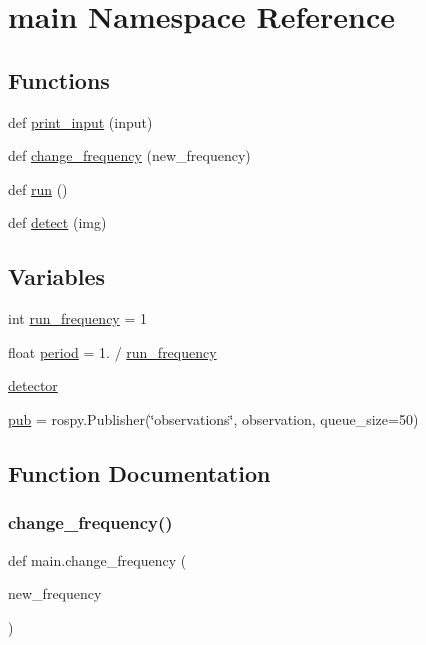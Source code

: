 \hypertarget{namespacemain}{}\section{main Namespace Reference}
\label{namespacemain}
\subsection*{Functions}
\begin{DoxyCompactItemize}
\item 
def \hyperlink{namespacemain_a0fe3fdb168f80f23bd787b6a6645d063}{print\+\_\+input} (input)
\item 
def \hyperlink{namespacemain_a191dcce5a995145c51a8935645d7de97}{change\+\_\+frequency} (new\+\_\+frequency)
\item 
def \hyperlink{namespacemain_a036aad8f2646851dd9488dda7d35c981}{run} ()
\item 
def \hyperlink{namespacemain_a03e14590002fed6ffd6ac75bfeb3403e}{detect} (img)
\end{DoxyCompactItemize}
\subsection*{Variables}
\begin{DoxyCompactItemize}
\item 
int \hyperlink{namespacemain_a57172d55d7c1b86fc48bcbc6c3783efb}{run\+\_\+frequency} = 1
\item 
float \hyperlink{namespacemain_a9ec7279618de6ff9195552f460584339}{period} = 1. / \hyperlink{namespacemain_a57172d55d7c1b86fc48bcbc6c3783efb}{run\+\_\+frequency}
\item 
\hyperlink{namespacemain_a245786520a72f57bea29a2e43f964e8e}{detector}
\item 
\hyperlink{namespacemain_a23ee90a24cfdad17960b8fcc6a299545}{pub} = rospy.\+Publisher(\char`\"{}observations\char`\"{}, observation, queue\+\_\+size=50)
\end{DoxyCompactItemize}


\subsection{Function Documentation}
\mbox{\label{namespacemain_a191dcce5a995145c51a8935645d7de97}} 
\subsubsection{\texorpdfstring{change\+\_\+frequency()}{change\_frequency()}}
{\footnotesize\ttfamily def main.\+change\+\_\+frequency (\begin{DoxyParamCaption}\item[{}]{new\+\_\+frequency }\end{DoxyParamCaption})}

